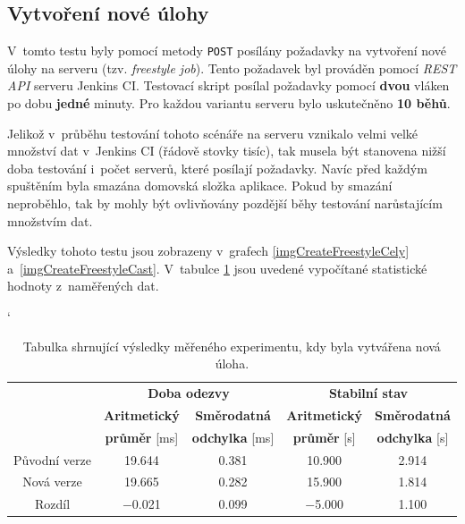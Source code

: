         \subsection{Vytvoření nové úlohy}
            V~tomto testu byly pomocí metody \texttt{POST} posílány požadavky na vytvoření
            nové úlohy na serveru (tzv. \emph{freestyle job}). Tento požadavek
            byl prováděn pomocí \emph{REST API} serveru Jenkins CI.
            Testovací skript posílal požadavky pomocí \textbf{dvou} vláken po dobu \textbf{jedné} minuty.
            Pro každou variantu serveru bylo uskutečněno \textbf{10 běhů}.

            Jelikož v~průběhu testování tohoto scénáře na serveru vznikalo velmi velké množství dat v~Jenkins CI (řádově stovky tisíc),
            tak musela být stanovena nižší doba testování i~počet serverů, které posílají požadavky.
            Navíc před každým spuštěním byla smazána domovská složka aplikace. Pokud by smazání neproběhlo,
            tak by mohly být ovlivňovány pozdější běhy testování narůstajícím množstvím dat.

            Výsledky tohoto testu jsou zobrazeny v~grafech \ref{imgCreateFreestyleCely} a~\ref{imgCreateFreestyleCast}.
            V~tabulce \ref{tabCreateFreestyleFinal} jsou uvedené vypočítané statistické hodnoty
            z~naměřených dat.

            \begin{table}[ht]
             \catcode`
             \begin{adjustwidth}{-0.5cm}{}
             \begin{center}
              \begin{tabular}{| c || c | c || c | c |} \hline
                \multirow{3}{*}{}  &   \multicolumn{2}{c||}{\textbf{Doba odezvy}}  &  \multicolumn{2}{c|}{\textbf{Stabilní stav}}\\ \cline{2-5}
                 & \textbf{Aritmetický}  &  \textbf{Směrodatná}  &  \textbf{Aritmetický} &  \textbf{Směrodatná}\\ 
                 & \textbf{průměr} [ms]  &  \textbf{odchylka} [ms]  &  \textbf{průměr} [s]  &  \textbf{odchylka} [s]\\ \hline
                Původní verze & 19.644  &  0.381 &  10.900 & 2.914 \\\hline
                Nová verze &  19.665 &  0.282 &  15.900 & 1.814 \\\hline
                Rozdíl & $-$0.021  &  0.099 &  $-$5.000 & 1.100 \\\hline  
              \end{tabular}
              \caption{Tabulka shrnující výsledky měřeného experimentu, kdy byla vytvářena nová úloha.}
              \label{tabCreateFreestyleFinal}
             \end{center}
             \end{adjustwidth}
            \end{table}


